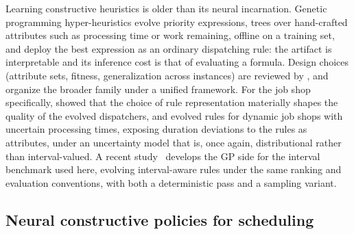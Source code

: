 \documentclass[preprint,12pt]{elsarticle}
\theoremstyle{definition}
\theoremstyle{remark}
\begin{document}
Learning constructive heuristics is older than its neural
incarnation. Genetic programming hyper-heuristics evolve priority
expressions, trees over hand-crafted attributes such as processing
time or work remaining, offline on a training set, and deploy the
best expression as an ordinary dispatching rule: the artifact is
interpretable and its inference cost is that of evaluating a formula.
Design choices (attribute sets, fitness, generalization across
instances) are reviewed by \citet{Branke2016}, and \citet{Nguyen2017}
organize the broader family under a unified framework. For the job
shop specifically, \citet{Nguyen2013} showed that the choice of rule
representation materially shapes the quality of the evolved
dispatchers, and \citet{Karunakaran2016} evolved rules for dynamic
job shops with uncertain processing times, exposing duration
deviations to the rules as attributes, under an uncertainty model
that is, once again, distributional rather than interval-valued. A recent
study~\citep{DiazGP2026} develops the GP side for the interval
benchmark used here, evolving interval-aware rules under the same
ranking and evaluation conventions, with both a deterministic pass
and a sampling variant.

\subsection{Neural constructive policies for scheduling}
\label{sec:related-learning}
\end{document}
